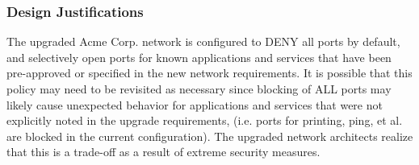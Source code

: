\begin{center}
\vspace{2.5em}



\end{center}

\subsubsection{Design Justifications}
The upgraded Acme Corp. network is configured to DENY all ports by default, and
selectively open ports for known applications and services that have been
pre-approved or specified in the new network requirements. It is possible that
this policy may need to be revisited as necessary since blocking of ALL ports 
may likely cause unexpected behavior for applications and services that were 
not explicitly noted in the upgrade requirements, (i.e. ports for printing, 
ping, et al. are blocked in the current configuration). The upgraded network
architects realize that this is a trade-off as a result of extreme security 
measures.

